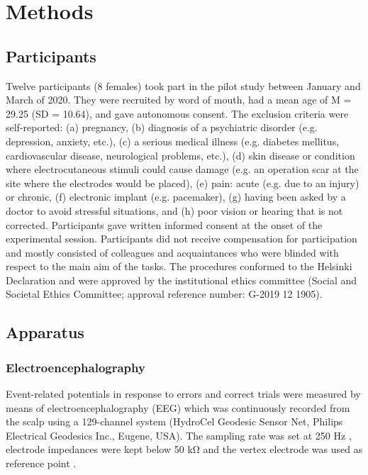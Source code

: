 \documentclass[twocolumn, serif, authordate, empirical]{jote-article}
\begin{document}
 {}\section*{Methods}  

 {} \subsection*{Participants}

Twelve participants (8 females) took part in the pilot study between January and March of 2020. They were recruited by word of mouth, had a mean age of M = 29.25 (SD = 10.64), and gave autonomous consent. The exclusion criteria were self-reported: (a) pregnancy, (b) diagnosis of a psychiatric disorder (e.g. depression, anxiety, etc.), (c) a serious medical illness (e.g. diabetes mellitus, cardiovascular disease, neurological problems, etc.), (d) skin disease or condition where electrocutaneous stimuli could cause damage (e.g. an operation scar at the site where the electrodes would be placed), (e) pain: acute (e.g. due to an injury) or chronic, (f) electronic implant (e.g. pacemaker), (g) having been asked by a doctor to avoid stressful situations, and (h) poor vision or hearing that is not corrected. Participants gave written informed consent at the onset of the experimental session. Participants did not receive compensation for participation and mostly consisted of colleagues and acquaintances who were blinded with respect to the main aim of the tasks. The procedures conformed to the Helsinki Declaration and were approved by the institutional ethics committee (Social and Societal Ethics Committee; approval reference number: G-2019 12 1905).~


 {}\subsection*{Apparatus}  

 {} \subsubsection*{Electroencephalography} Event-related potentials in response to errors and correct trials were measured by means of electroencephalography (EEG) which was continuously recorded from the scalp using a 129-channel system (HydroCel Geodesic Sensor Net, Philips Electrical Geodesics Inc., Eugene, USA). The sampling rate was set at 250 Hz \parencite{Trujillo2007, Hajcak2005, Hajcak2008}, electrode impedances were kept below 50 kΩ and the vertex electrode was used as reference point \parencite{Sucec2019, Tan2019}.
\end{document}
